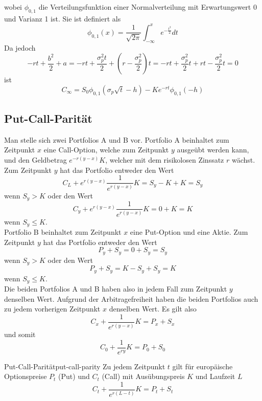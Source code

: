 \documentclass[11pt]{report} %
\begin{document}
wobei $\phi_{0, 1}$ die Verteilungsfunktion einer Normalverteilung mit Erwartungswert 0 und Varianz 1 ist. Sie ist definiert als $$\phi_{0, 1}(x)=\frac{1}{\sqrt{2\pi}}\int_{-\infty}^{x}e^{-\frac{t^2}{2}}dt$$ Da jedoch $$-rt+\frac{b^2}{2}+a=-rt+\frac{\sigma_p^2t}{2}+\left(r-\frac{\sigma_p^2}{2}\right)t=-rt+\frac{\sigma_p^2}{2}t+rt-\frac{\sigma_p^2}{2}t=0$$ ist
\begin{equation}\label{eq:black-scholes-eq-call}
    C_\infty=S_0\phi_{0, 1}(\sigma_p\sqrt{t}-h)-Ke^{-rt}\phi_{0, 1}(-h)
\end{equation}
\subsection{Put-Call-Parität}
Man stelle sich zwei Portfolios A und B vor. Portfolio A beinhaltet zum Zeitpunkt $x$ eine Call-Option, welche zum Zeitpunkt $y$ ausgeübt werden kann, und den Geldbetrag $e^{-r(y-x)}K$, welcher mit dem risikolosen Zinssatz $r$ wächst. Zum Zeitpunkt $y$ hat das Portfolio entweder den Wert $$C_L+e^{r(y-x)}\frac{1}{e^{r(y-x)}}K=S_y-K+K=S_y$$ wenn $S_y>K$ oder den Wert $$C_y+e^{r(y-x)}\frac{1}{e^{r(y-x)}}K=0+K=K$$ wenn $S_y\leq K$.\\
Portfolio B beinhaltet zum Zeitpunkt $x$ eine Put-Option und eine Aktie. Zum Zeitpunkt $y$ hat das Portfolio entweder den Wert $$P_y+S_y=0+S_y=S_y$$ wenn $S_y > K$ oder den Wert $$P_y+S_y=K-S_y+S_y=K$$ wenn $S_y\leq K$.\\
Die beiden Portfolios A und B haben also in jedem Fall zum Zeitpunkt $y$ denselben Wert. Aufgrund der Arbitragefreiheit haben die beiden Portfolios auch zu jedem vorherigen Zeitpunkt $x$ denselben Wert. Es gilt also $$C_x+\frac{1}{e^{r(y-x)}}K=P_x+S_x$$ und somit $$C_0+\frac{1}{e^{ry}}K=P_0+S_0$$
\begin{Theorem}{Put-Call-Parität}{put-call-parity}
    Zu jedem Zeitpunkt $t$ gilt für europäische Optionspreise $P_t$ (Put) und $C_t$ (Call) mit Ausübungspreis $K$ und Laufzeit $L$ $$C_t+\frac{1}{e^{r(L-t)}}K=P_t+S_t$$
\end{Theorem}
\end{document}
